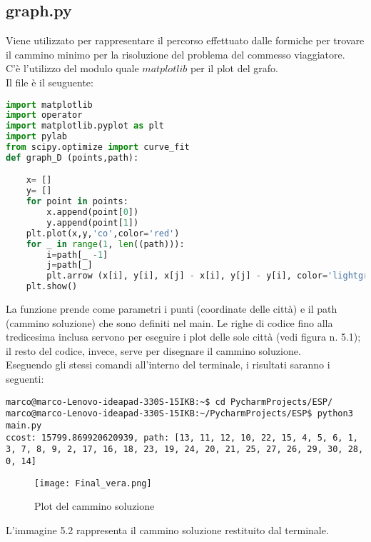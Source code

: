 \documentclass[a4paper,12pt]{report}
\begin{document}
\subsection{graph.py}
Viene utilizzato per rappresentare il percorso effettuato dalle formiche per trovare il cammino minimo per la risoluzione del problema del commesso viaggiatore.\\
C'è l'utilizzo del modulo quale $matplotlib$ per il plot del grafo.\\    
Il file è il seuguente:
\begin{lstlisting}[language=Python]
import matplotlib
import operator
import matplotlib.pyplot as plt
import pylab
from scipy.optimize import curve_fit
def graph_D (points,path):

    x= []
    y= []
    for point in points:
        x.append(point[0])
        y.append(point[1])
    plt.plot(x,y,'co',color='red')
    for _ in range(1, len((path))):
        i=path[_ -1]
        j=path[_]
        plt.arrow (x[i], y[i], x[j] - x[i], y[j] - y[i], color='lightgreen', length_includes_head=True)
    plt.show()
\end{lstlisting}
La funzione prende come parametri i punti (coordinate delle città) e il path (cammino soluzione) che sono definiti nel main.
Le righe di codice fino alla tredicesima inclusa servono per eseguire i plot delle sole città (vedi figura n. 5.1); il resto del codice, invece, serve per disegnare il cammino soluzione.\\
Eseguendo gli stessi comandi all'interno del terminale, i risultati saranno i seguenti:
\begin{lstlisting}
marco@marco-Lenovo-ideapad-330S-15IKB:~$ cd PycharmProjects/ESP/
marco@marco-Lenovo-ideapad-330S-15IKB:~/PycharmProjects/ESP$ python3 main.py 
ccost: 15799.869920620939, path: [13, 11, 12, 10, 22, 15, 4, 5, 6, 1, 3, 7, 8, 9, 2, 17, 16, 18, 23, 19, 24, 20, 21, 25, 27, 26, 29, 30, 28, 0, 14]
\end{lstlisting}
\begin{figure}[H]
    \centering
    \texttt{[image: Final\_vera.png]}
    \caption{Plot del cammino soluzione}
    \label{fig:my_label}
\end{figure}
L'immagine 5.2 rappresenta il cammino soluzione restituito dal terminale.
\end{document}
